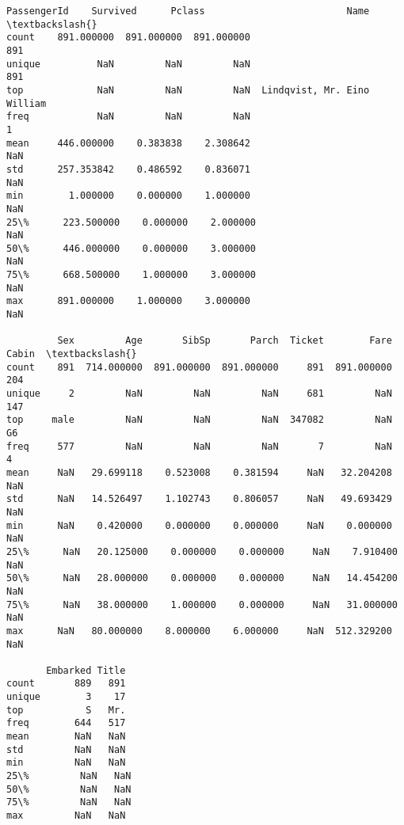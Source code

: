 \documentclass[9pt]{ltjsarticle}
\makeatletter
\newcommand{\boxspacing}{\kern\kvtcb@left@rule\kern\kvtcb@boxsep}
\newcommand{\prompt}[4]{
        {\ttfamily\llap{{\color{#2}[#3]:\hspace{3pt}#4}}\vspace{-\baselineskip}}
    }
\makeatother
\begin{document}
            \begin{tcolorbox}[breakable, size=fbox, boxrule=.5pt, pad at break*=1mm, opacityfill=0]
\prompt{Out}{outcolor}{11}{\boxspacing}
\begin{Verbatim}[commandchars=\\\{\}]
        PassengerId    Survived      Pclass                         Name  \textbackslash{}
count    891.000000  891.000000  891.000000                          891
unique          NaN         NaN         NaN                          891
top             NaN         NaN         NaN  Lindqvist, Mr. Eino William
freq            NaN         NaN         NaN                            1
mean     446.000000    0.383838    2.308642                          NaN
std      257.353842    0.486592    0.836071                          NaN
min        1.000000    0.000000    1.000000                          NaN
25\%      223.500000    0.000000    2.000000                          NaN
50\%      446.000000    0.000000    3.000000                          NaN
75\%      668.500000    1.000000    3.000000                          NaN
max      891.000000    1.000000    3.000000                          NaN

         Sex         Age       SibSp       Parch  Ticket        Fare Cabin  \textbackslash{}
count    891  714.000000  891.000000  891.000000     891  891.000000   204
unique     2         NaN         NaN         NaN     681         NaN   147
top     male         NaN         NaN         NaN  347082         NaN    G6
freq     577         NaN         NaN         NaN       7         NaN     4
mean     NaN   29.699118    0.523008    0.381594     NaN   32.204208   NaN
std      NaN   14.526497    1.102743    0.806057     NaN   49.693429   NaN
min      NaN    0.420000    0.000000    0.000000     NaN    0.000000   NaN
25\%      NaN   20.125000    0.000000    0.000000     NaN    7.910400   NaN
50\%      NaN   28.000000    0.000000    0.000000     NaN   14.454200   NaN
75\%      NaN   38.000000    1.000000    0.000000     NaN   31.000000   NaN
max      NaN   80.000000    8.000000    6.000000     NaN  512.329200   NaN

       Embarked Title
count       889   891
unique        3    17
top           S   Mr.
freq        644   517
mean        NaN   NaN
std         NaN   NaN
min         NaN   NaN
25\%         NaN   NaN
50\%         NaN   NaN
75\%         NaN   NaN
max         NaN   NaN
\end{Verbatim}
\end{tcolorbox}
        
\end{document}
